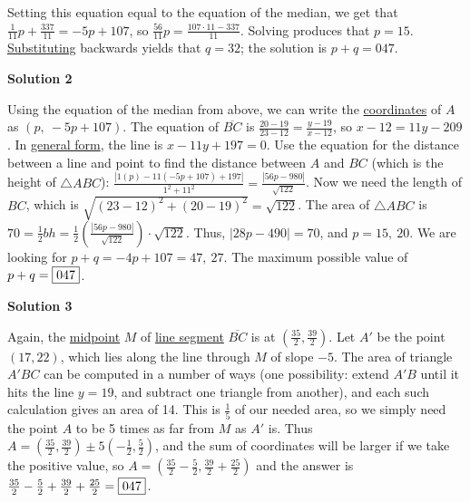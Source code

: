 \begin{enumerate}
 Setting this equation equal to the equation of the median, we get that $\frac{1}{11}p + \frac{337}{11} = -5p + 107$, so $\frac{56}{11}p = \frac{107 \cdot 11 - 337}{11}$. Solving produces that $p = 15$. \href{https://artofproblemsolving.com/wiki/index.php?title=Substitution}{Substituting} backwards yields that $q = 32$; the solution is $p + q = \boxed{047}$.

 



\textbf{Solution 2}

Using the equation of the median from above, we can write the \href{https://artofproblemsolving.com/wiki/index.php?title=Coordinate}{coordinates} of $A$ as $(p,\ -5p + 107)$. The equation of $\overline{BC}$ is $\frac{20 - 19}{23 - 12} = \frac{y - 19}{x - 12}$, so $x - 12 = 11y - 209$. In \href{https://artofproblemsolving.com/wiki/index.php?title=General\_form&action=edit&redlink=1}{general form}, the line is $x - 11y + 197 = 0$. Use the equation for the distance between a line and point to find the distance between $A$ and $BC$ (which is the height of $\triangle ABC$): $\frac{|1(p) - 11(-5p + 107) + 197|}{1^2 + 11^2} = \frac{|56p - 980|}{\sqrt{122}}$. Now we need the length of $BC$, which is $\sqrt{(23 - 12)^2 + (20 - 19)^2} = \sqrt{122}$. The area of $\triangle ABC$ is $70 = \frac{1}{2}bh = \frac{1}{2}\left(\frac{|56p - 980|}{\sqrt{122}}\right) \cdot \sqrt{122}$. Thus, $|28p - 490| = 70$, and $p = 15,\ 20$. We are looking for $p + q = -4p + 107 = 47,\ 27$. The maximum possible value of $p + q = \fbox{047}$.

 



\textbf{Solution 3}

Again, the \href{https://artofproblemsolving.com/wiki/index.php?title=Midpoint}{midpoint} $M$ of \href{https://artofproblemsolving.com/wiki/index.php?title=Line\_segment}{line segment} $\overline{BC}$ is at $\left(\frac{35}{2}, \frac{39}{2}\right)$. Let $A'$ be the point $(17, 22)$, which lies along the line through $M$ of slope $-5$.  The area of triangle $A'BC$ can be computed in a number of ways (one possibility: extend $A'B$ until it hits the line $y = 19$, and subtract one triangle from another), and each such calculation gives an area of 14.  This is $\frac{1}{5}$ of our needed area, so we simply need the point $A$ to be 5 times as far from $M$ as $A'$ is.  Thus $A = \left(\frac{35}{2}, \frac{39}{2}\right) \pm 5\left(-\frac{1}{2}, \frac{5}{2}\right)$, and the sum of coordinates will be larger if we take the positive value, so $A = \left(\frac{35}{2} - \frac{5}2, \frac{39}{2} + \frac{25}{2}\right)$ and the answer is $\frac{35}{2} - \frac{5}2 + \frac{39}{2} + \frac{25}{2} = \fbox{047}$.


\end{enumerate}
